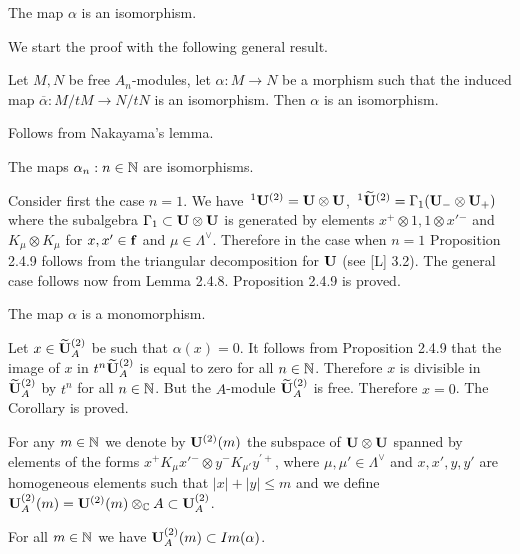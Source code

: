   The map  $\alpha$  is an isomorphism.
\endproclaim

  We start the proof with the following general
result.
\enddemo

  Let $M,N$  be free $A_n$-modules,  let  $\alpha: M \to N$  be
a
morphism such that the induced map  $\overline{\alpha}: M/tM \to N/tN$ is an
isomorphism.  Then $\alpha$ is an isomorphism.
\endproclaim

  Follows from Nakayama's lemma.
\enddemo

  The maps  $\alpha_n: n \in {\Bbb N}$  are
isomorphisms.
\endproclaim

  Consider first the case $n = 1$.  We have\
${}^1{\bold U}^{(2)} = {\bold U} \otimes {\bold U}$,\
${}^1\widetilde{{\bold U}}^{(2)} = \Gamma_1 ({\bold U}_- \otimes {\bold U}_+)$
where the subalgebra  $\Gamma_1 \subset {\bold U} \otimes {\bold U}$  is
generated
by elements   $x^+ \otimes 1, 1 \otimes x{'{}^-}$  and $K_\mu \otimes K_\mu$
for
$x,x' \in {\bold f}$  and $\mu \in \Lambda^\vee$.  Therefore in the case when
$n = 1$ Proposition 2.4.9 follows from the triangular decomposition for
${\bold U}$  (see [L] 3.2).  The general case follows now from Lemma 2.4.8.
Proposition 2.4.9 is proved.
\enddemo

  The map $\alpha$  is a monomorphism.
\endproclaim

  Let  $x \in \widetilde{{\bold U}}_A^{(2)}$  be
such that  $\alpha(x) = 0$.  It follows from Proposition 2.4.9 that the
image of  $x$ in  $t^n \widetilde{{\bold U}}_A^{(2)}$
is equal to zero for all $n \in {\Bbb N}$.  Therefore  $x$  is divisible in
$\widetilde{{\bold U}}_A^{(2)}$  by  $t^n$  for all $n \in {\Bbb N}$.
But the $A$-module $\widetilde{{\bold U}}_A^{(2)}$  is free.  Therefore
$x = 0$.  The Corollary is proved.
\enddemo

\medpagebreak

  For any $m \in {\Bbb N}$  we denote by ${\bold
U}^{(2)}(m)$  the
subspace of  ${\bold U} \otimes {\bold U}$  spanned by elements of the forms
$x^+K_\mu x{'{}^-} \otimes y^-K_{\mu'}y^{'+}$, where $\mu,\mu' \in
\Lambda^\vee$  and
$x,x',y,y'$  are homogeneous elements such that  $|x| + |y| \le m$  and we
define  ${\bold U}_A^{(2)}(m) = {\bold U}^{(2)}(m) \otimes_{\Bbb C} A \subset
{\bold U}_A^{(2)}$.

  For all $m \in {\Bbb N}$  we have
${\bold U}_A^{(2)}(m) \subset Im(\alpha)$.
\endproclaim

